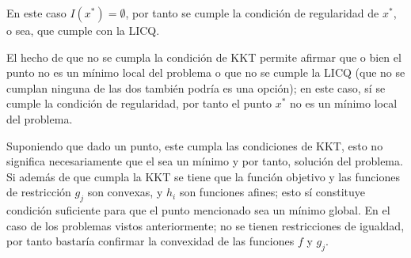 \documentclass[titlepage, 11pt]{scrartcl}
\begin{document}
\begin{enumerate}
\begin{enumerate}
\begin{enumerate}
		En este caso $I(x^*)  = \emptyset$, por tanto se cumple la condici\'on de regularidad de $x^*$, o sea, que cumple con la LICQ.
		
		El hecho de que no se cumpla la condición de KKT permite afirmar que o bien el punto no es un m\'inimo local del problema o que no se cumple la LICQ (que no se cumplan ninguna de las dos también podría es una opci\'on); en este caso, s\'i se cumple la condici\'on de regularidad, por tanto el punto $x^*$ no es un m\'inimo local del problema.
		\end{enumerate}

		
	\end{enumerate}
\end{enumerate}

\vspace{1cm}
Suponiendo que dado un punto, este cumpla las condiciones de KKT, esto no significa necesariamente que el sea un mínimo y por tanto, soluci\'on del problema. Si adem\'as de que cumpla la KKT se tiene que la funci\'on objetivo y las funciones de restricci\'on $g_j$ son convexas, y $h_i$ son funciones afines; esto s\'i constituye condici\'on suficiente para que el punto mencionado sea un m\'inimo global. En el caso de los problemas vistos anteriormente; no se tienen restricciones de igualdad, por tanto bastar\'ia confirmar la convexidad de las funciones $f$ y $g_j$.
\end{document}
